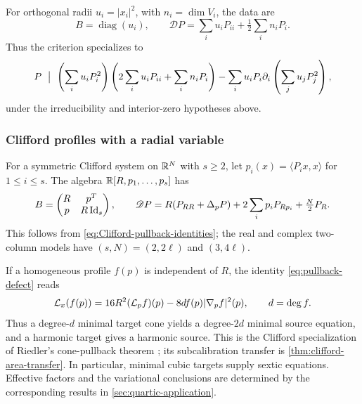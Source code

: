For orthogonal radii $u_i=|x_i|^2$, with $n_i=\dim V_i$, the data are
\begin{equation}\label{eq:three-radii-profile-operator}
 B=\operatorname{diag}(u_i),\qquad
 \mathscr D P=\sum_i u_iP_{ii}+\tfrac12\sum_i n_iP_i.
\end{equation}
Thus the criterion specializes to
\begin{equation}\label{eq:three-radii-minimality}
 P\ \bigm|\
 \left(\sum_i u_iP_i^2\right)
 \left(2\sum_i u_iP_{ii}+\sum_i n_iP_i\right)
 -\sum_i u_iP_i\partial_i\left(\sum_j u_jP_j^2\right),
\end{equation}
under the irreducibility and interior-zero hypotheses above.

\subsubsection{Clifford profiles with a radial variable}

For a symmetric Clifford system on $\mathbb R^N$ with $s\geq2$, let
$p_i(x)=\langle P_ix,x\rangle$ for $1\leq i\leq s$.
The algebra $\mathbb R[R,p_1,\ldots,p_s]$ has
\begin{equation}\label{eq:three-spin-profile-operator}
 B=\begin{pmatrix}R&p^T\\p&R\operatorname{Id}_s\end{pmatrix},\qquad
 \mathscr D P=R(P_{RR}+\Delta_pP)
      +2\sum_i p_iP_{Rp_i}+\tfrac N2P_R.
\end{equation}
This follows from \eqref{eq:Clifford-pullback-identities}; the real
and complex two-column models have $(s,N)=(2,2\ell)$ and $(3,4\ell)$.

If a homogeneous profile $f(p)$ is independent of $R$, the identity
\eqref{eq:pullback-defect} reads
\begin{equation}\label{eq:quadratic-Clifford-profile-transfer}
 \mathcal L_x(f(p))=16R^2(\mathcal L_pf)(p)
             -8d f(p)|\nabla_pf|^2(p),\qquad d=\deg f.
\end{equation}
Thus a degree-$d$ minimal target cone yields a degree-$2d$ minimal
source equation, and a harmonic target gives a harmonic source.
This is the Clifford specialization of Riedler's cone-pullback
theorem \cite[Theorem~5.1.4]{RiedlerThesis25}; its subcalibration
transfer is \cref{thm:clifford-area-transfer}. In particular, minimal
cubic targets supply sextic equations. Effective factors and the
variational conclusions are determined by the corresponding results
in \cref{sec:quartic-application}.

